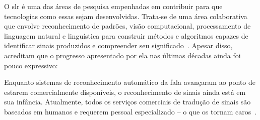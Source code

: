 O \acrfull{slr} é uma das áreas de pesquisa empenhadas em contribuir para que tecnologias como essas sejam desenvolvidas. Trata-se de uma área colaborativa que envolve reconhecimento de padrões, visão computacional, processamento de linguagem natural e linguística para construir métodos e algoritmos capazes de identificar sinais produzidos e compreender seu significado~\cite{wadhawan-2021-slr-systems-review}. 
Apesar disso, \citeauthor{cooper-2011-slr} acreditam que o progresso apresentado por ela nas últimas décadas ainda foi pouco expressivo:

\begin{citacao}
    Enquanto sistemas de reconhecimento automático da fala avançaram ao ponto de estarem comercialmente disponíveis, o reconhecimento de sinais ainda está em sua infância. Atualmente, todos os serviços comerciais de tradução de sinais são baseados em humanos e requerem pessoal especializado -- o que os tornam caros~\cite[tradução nossa]{cooper-2011-slr}.
\end{citacao}


